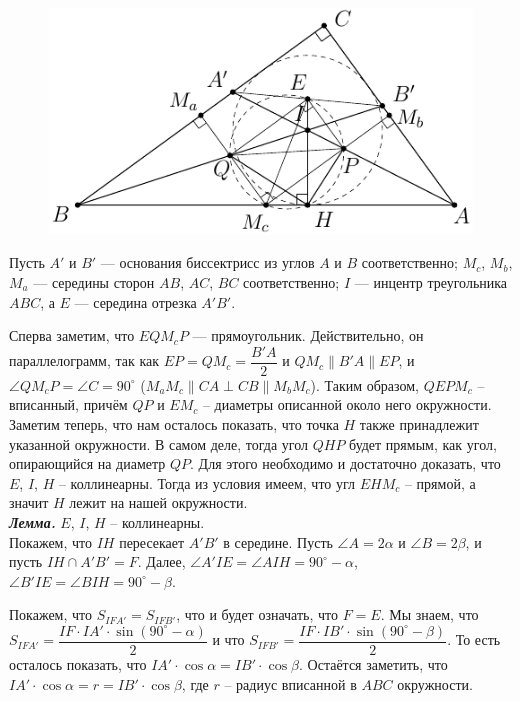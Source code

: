 \documentclass[14pt]{extarticle}
\theoremstyle{definition}
\theoremstyle{theorem}
\begin{document}
\begin{figure}[H]
\centering
\includegraphics[width=14cm]{./figure.pdf}
\end{figure}

Пусть \(A'\) и \(B'\) --- основания биссектрисс из углов \(A\) и 
\(B\) соответственно; \(M_c\), \(M_b\), \(M_a\) --- середины сторон 
\(AB\), \(AC\), \(BC\) соответственно; \(I\) --- инцентр треугольника 
\(ABC\), а \(E\) --- середина отрезка \(A'B'\). 

Сперва заметим, что \(EQM_cP\) --- прямоугольник. Действительно, он 
параллелограмм, так как \(EP = QM_c = \dfrac{B'A}{2}\) и \(QM_c 
\parallel B'A \parallel EP\), и \(\angle QM_cP = \angle C = 90^{\circ}\)
(\(M_aM_c \parallel CA \perp CB \parallel M_bM_c\)). Таким образом, 
\(QEPM_c\) -- вписанный, причём \(QP\) и \(EM_c\) -- диаметры описанной 
около него окружности. Заметим теперь, что нам осталось показать, что точка 
\(H\) также принадлежит указанной окружности. В самом деле, тогда угол 
\(QHP\) будет прямым, как угол, опирающийся на диаметр \(QP\). 
Для этого необходимо и достаточно доказать, что \(E\), \(I\), \(H\) 
-- коллинеарны. Тогда из условия имеем, что угл \(EHM_c\) -- прямой, а 
значит \(H\) лежит на нашей окружности. \\


\textbf{\textit{Лемма.}} \(E\), \(I\), \(H\) -- коллинеарны.\\
Покажем, что \(IH\) пересекает \(A'B'\) в середине. 
Пусть \(\angle A = 2 \alpha\) и \(\angle B = 2 \beta\), и пусть \(IH \cap 
A'B' = F\). Далее, \(\angle A'IE = \angle AIH = 90^{\circ} - \alpha\), 
\(\angle B'IE = \angle BIH = 90^{\circ} - \beta\). 

Покажем, что \(S_{IFA'} = S_{IFB'}\), что и будет означать, что \(F = E\).
Мы знаем, что \(S_{IFA'} = \dfrac{IF \cdot IA' \cdot \sin{(90^{\circ} - 
\alpha)}}{2}\)
и что \(S_{IFB'} = \dfrac{IF \cdot IB' \cdot \sin{(90^{\circ} - 
\beta)}}{2}\). То есть осталось показать, что \(IA' \cdot \cos{\alpha} = 
IB' \cdot \cos{\beta}\). Остаётся заметить, что \(IA' \cdot \cos{\alpha} = 
r = IB' \cdot \cos{\beta}\), где \(r\) -- радиус вписанной в \(ABC\) 
окружности.
\end{document}
